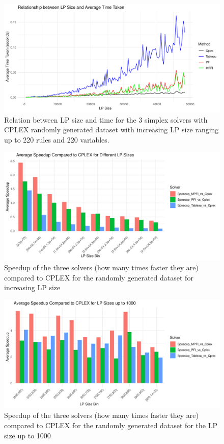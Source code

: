 \begin{figure}[p]
    \includegraphics[width=0.8\paperwidth, height=\paperheight, keepaspectratio]{figures/cplex_vs_all_random_large.pdf}
    \caption{Relation between LP size and time for the 3 simplex solvers with CPLEX randomly generated
        dataset with increasing LP size ranging up to 220 rules and 220 variables.}
    \label{cplex_vs_all_random_large}
\end{figure}

\begin{figure}[!htb]
    \centering
    \includegraphics[width=\linewidth]{figures/speedup_vs_cplex_random_200.pdf}
    \caption{Speedup of the three solvers (how many times faster they are) compared to CPLEX for
        the randomly generated dataset for increasing LP size}
    \label{fig:speedup_cplex_random.pdf}
\end{figure}

\begin{figure}[!htb]
    \centering
    \includegraphics[width=\linewidth]{figures/speedup_cplex_less_1000.pdf}
    \caption{Speedup of the three solvers (how many times faster they are) compared to CPLEX for
        the randomly generated dataset for the LP size up to 1000}
    \label{fig:speedup_cplex_less_1000.pdf}
\end{figure}



